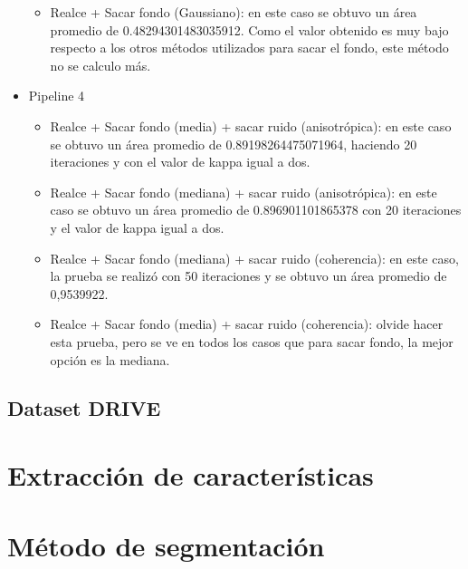 \begin{itemize}
\begin{itemize}
			\item Realce + Sacar fondo (Gaussiano): en este caso se obtuvo un área promedio de 0.48294301483035912. Como el valor obtenido es muy bajo respecto a los otros métodos utilizados para sacar el fondo, este método no se calculo más.
		\end{itemize}
	\item Pipeline 4
		\begin{itemize}
			\item Realce + Sacar fondo (media) + sacar ruido (anisotrópica): en este caso se obtuvo un área promedio de 0.89198264475071964, haciendo 20 iteraciones y con el valor de kappa igual a dos.
			\item Realce + Sacar fondo (mediana) + sacar ruido (anisotrópica): en este caso se obtuvo un área promedio de 0.896901101865378 con 20 iteraciones y el valor de kappa igual a dos.
			\item Realce + Sacar fondo (mediana) + sacar ruido (coherencia): en este caso, la prueba se realizó con 50 iteraciones y se obtuvo un área promedio de 0,9539922.
			\item Realce + Sacar fondo (media) + sacar ruido (coherencia): olvide hacer esta prueba, pero se ve en todos los casos que para sacar fondo, la mejor opción es la mediana.
		\end{itemize}
\end{itemize}


\subsection{Dataset DRIVE}



\section{Extracci\'on de caracter\'isticas}



\section{M\'etodo de segmentaci\'on}

